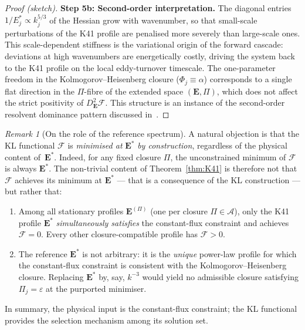 \documentclass[12pt,a4paper]{article}
\theoremstyle{definition}
\theoremstyle{plain}
\theoremstyle{remark}
\newtheorem{remark}[definition]{Remark}
\begin{document}
\begin{proof}[Proof (sketch)]
\medskip
\noindent\textbf{Step 5b: Second-order interpretation.}\;
The diagonal entries $1/E_j^* \propto k_j^{5/3}$ of the Hessian grow with
wavenumber, so that small-scale perturbations of the K41 profile are
penalised more severely than large-scale ones.  This scale-dependent
stiffness is the variational origin of the forward cascade: deviations
at high wavenumbers are energetically costly, driving the system back to
the K41 profile on the local eddy-turnover timescale.  The one-parameter
freedom in the Kolmogorov--Heisenberg closure ($\Phi_j \equiv \alpha$)
corresponds to a single flat direction in the $\Pi$-fibre of the
extended space $(\mathbf{E}, \Pi)$, which does not affect the strict
positivity of $D^2_{\mathbf{E}}\mathcal{F}$.  This structure is an
instance of the second-order resolvent dominance pattern discussed
in~\cite{FST-Unified2026}.
\end{proof}

\begin{remark}[On the role of the reference spectrum]\label{rem:circularity}
A natural objection is that the KL functional $\mathcal{F}$ is
\emph{minimised at} $\mathbf{E}^*$ \emph{by construction}, regardless
of the physical content of~$\mathbf{E}^*$.  Indeed, for any fixed
closure $\Pi$, the unconstrained minimum of $\mathcal{F}$ is always
$\mathbf{E}^*$.  The non-trivial content of Theorem~\ref{thm:K41} is
therefore not that $\mathcal{F}$ achieves its minimum at $\mathbf{E}^*$
--- that is a consequence of the KL construction --- but rather that:
\begin{enumerate}
\item Among all stationary profiles $\mathbf{E}^{(\Pi)}$ (one per closure
  $\Pi \in \mathscr{A}$), only the K41 profile $\mathbf{E}^*$
  \emph{simultaneously satisfies} the constant-flux constraint and
  achieves $\mathcal{F} = 0$.  Every other closure-compatible profile
  has $\mathcal{F} > 0$.
\item The reference $\mathbf{E}^*$ is not arbitrary: it is the
  \emph{unique} power-law profile for which the constant-flux constraint
  is consistent with the Kolmogorov--Heisenberg closure.  Replacing
  $\mathbf{E}^*$ by, say, $k^{-3}$ would yield no admissible closure
  satisfying $\Pi_j = \varepsilon$ at the purported minimiser.
\end{enumerate}
In summary, the physical input is the constant-flux constraint; the KL
functional provides the selection mechanism among its solution set.
\end{remark}
\end{document}
